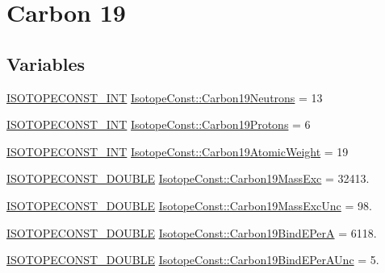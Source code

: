 \hypertarget{group___isotope_const-_carbon-_c19}{}\section{Carbon 19}
\label{group___isotope_const-_carbon-_c19}
\subsection*{Variables}
\begin{DoxyCompactItemize}
\item 
\mbox{\hyperlink{group___isotope_const-_macros_ga5f18360b3e99483a35c32d789e62621c}{I\+S\+O\+T\+O\+P\+E\+C\+O\+N\+S\+T\+\_\+\+I\+NT}} \mbox{\hyperlink{group___isotope_const-_carbon-_c19_gacddc54dffd5487fb154ae6012685949b}{Isotope\+Const\+::\+Carbon19\+Neutrons}} = 13
\item 
\mbox{\hyperlink{group___isotope_const-_macros_ga5f18360b3e99483a35c32d789e62621c}{I\+S\+O\+T\+O\+P\+E\+C\+O\+N\+S\+T\+\_\+\+I\+NT}} \mbox{\hyperlink{group___isotope_const-_carbon-_c19_gaca7954d836a3edc61cf1f2c8a9098dfb}{Isotope\+Const\+::\+Carbon19\+Protons}} = 6
\item 
\mbox{\hyperlink{group___isotope_const-_macros_ga5f18360b3e99483a35c32d789e62621c}{I\+S\+O\+T\+O\+P\+E\+C\+O\+N\+S\+T\+\_\+\+I\+NT}} \mbox{\hyperlink{group___isotope_const-_carbon-_c19_ga6120d363ad0b694a20d0bde1c0619ea2}{Isotope\+Const\+::\+Carbon19\+Atomic\+Weight}} = 19
\item 
\mbox{\hyperlink{group___isotope_const-_macros_ga8f45a7272ce02c0b4c65c44636ed719a}{I\+S\+O\+T\+O\+P\+E\+C\+O\+N\+S\+T\+\_\+\+D\+O\+U\+B\+LE}} \mbox{\hyperlink{group___isotope_const-_carbon-_c19_ga633d4ab889ddfa376065d0b23935226a}{Isotope\+Const\+::\+Carbon19\+Mass\+Exc}} = 32413.
\item 
\mbox{\hyperlink{group___isotope_const-_macros_ga8f45a7272ce02c0b4c65c44636ed719a}{I\+S\+O\+T\+O\+P\+E\+C\+O\+N\+S\+T\+\_\+\+D\+O\+U\+B\+LE}} \mbox{\hyperlink{group___isotope_const-_carbon-_c19_ga6f4ee86921a299a7f2e05f16b7e83f37}{Isotope\+Const\+::\+Carbon19\+Mass\+Exc\+Unc}} = 98.
\item 
\mbox{\hyperlink{group___isotope_const-_macros_ga8f45a7272ce02c0b4c65c44636ed719a}{I\+S\+O\+T\+O\+P\+E\+C\+O\+N\+S\+T\+\_\+\+D\+O\+U\+B\+LE}} \mbox{\hyperlink{group___isotope_const-_carbon-_c19_gabae202e93bc7e9643ca27445d1e12680}{Isotope\+Const\+::\+Carbon19\+Bind\+E\+PerA}} = 6118.
\item 
\mbox{\hyperlink{group___isotope_const-_macros_ga8f45a7272ce02c0b4c65c44636ed719a}{I\+S\+O\+T\+O\+P\+E\+C\+O\+N\+S\+T\+\_\+\+D\+O\+U\+B\+LE}} \mbox{\hyperlink{group___isotope_const-_carbon-_c19_ga2a0f97f66c454f67d71cff9bb17ec370}{Isotope\+Const\+::\+Carbon19\+Bind\+E\+Per\+A\+Unc}} = 5.

\end{DoxyCompactItemize}
